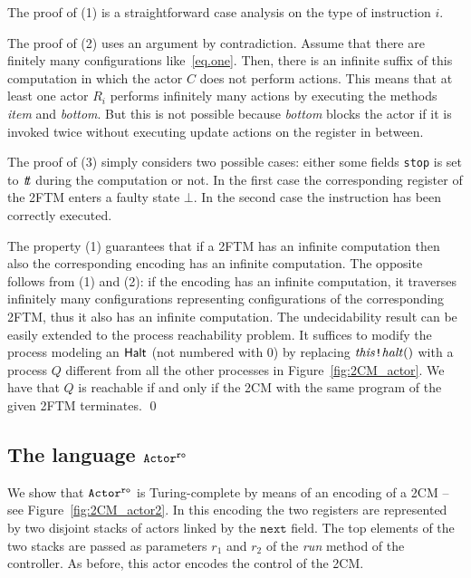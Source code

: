 \documentclass{LMCS}
\theoremstyle{plain}\newtheorem{proposition}[thm]{Proposition}
\theoremstyle{plain}\newtheorem{lemma}[thm]{Lemma}
\theoremstyle{plain}\newtheorem{theorem}[thm]{Theorem}
\theoremstyle{plain}\newtheorem{corollary}[thm]{Corollary}
\newcommand{\invk}{\mbox{\tt !}}
\newcommand{\true}{{\it t\hspace{-2.3pt}t}}
\newcommand{\actro}{${\tt Actor^{\tt ro}}$}
\begin{document}
\noindent The proof of (1) is a straightforward case analysis on the 
type of instruction $i$.

The proof of (2) uses an argument by contradiction. Assume that there are 
finitely many configurations like~\ref{eq.one}. Then, there is an infinite
suffix of this computation in which the actor $C$ does not perform actions.
This means that at least one actor $R_i$ performs infinitely many actions
by executing the methods {\it item} and {\it bottom}. But this is not possible
because {\it bottom} blocks the actor if it is invoked twice without
executing update actions on the register in between.

The proof of (3) simply considers two possible cases: either some
fields {\tt stop} is set to $\true$ during the computation or not.
In the first case the corresponding register of the 2FTM enters a faulty state
$\bot$. In the second case the instruction has been correctly
executed.





The property (1) guarantees that if a 2FTM has an infinite computation
then also the corresponding encoding has an infinite computation.
The opposite follows from (1) and (2): if the encoding has an infinite
computation, it traverses infinitely many configurations representing
configurations of the corresponding 2FTM, thus it also has an infinite 
computation.
The undecidability result can be easily extended
to the process reachability problem. It suffices to
modify the process modeling an ${\sf Halt}$ (not numbered with 0)
by replacing ${\it this} \invk {\it halt}()$ with 
a process $Q$ different from all the other processes in
Figure~\ref{fig:2CM_actor}. We have that
$Q$ is reachable if and only if the 2CM with the same program of
the given 2FTM terminates.
\qed
\fi



\subsection{The language {\actro}}
\label{ssec.readonly}
We show that {\actro}
is Turing-complete by means of an encoding of a 2CM
-- see Figure~\ref{fig:2CM_actor2}. 
In this encoding the two registers
are represented by two disjoint stacks of actors linked by the $\mathtt{next}$ field.
The top elements of the two stacks are passed as parameters $r_1$ and $r_2$ 
of the {\it run} method
of the controller. As before, this actor encodes the control of the 2CM.
\end{document}
